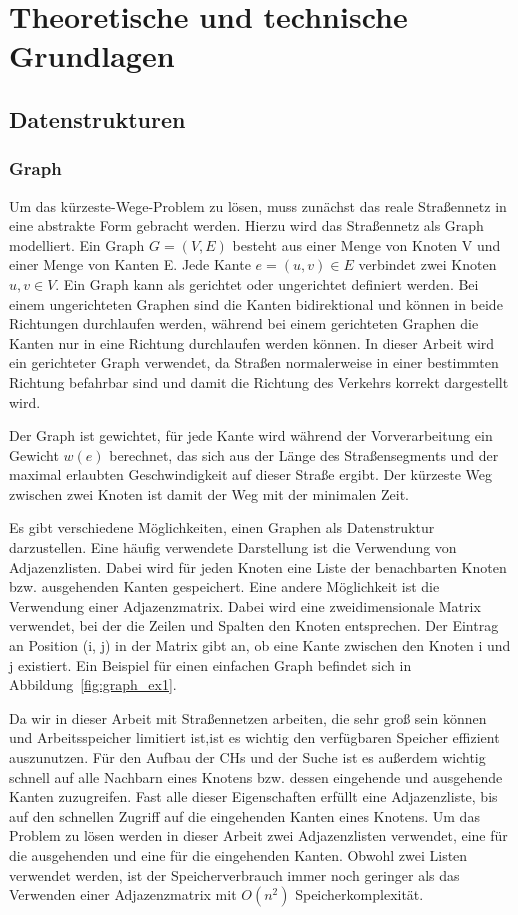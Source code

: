 \section{Theoretische und technische Grundlagen}

\subsection{Datenstrukturen}
\subsubsection{Graph}
Um das kürzeste-Wege-Problem zu lösen, muss zunächst das reale Straßennetz in eine abstrakte Form
gebracht werden. Hierzu wird das Straßennetz als Graph modelliert. Ein Graph $G = (V,E)$ besteht aus
einer Menge von Knoten V und einer Menge von Kanten E. Jede Kante $e = (u,v)\in E$ verbindet zwei
Knoten $u,v \in V$. Ein Graph kann als gerichtet oder ungerichtet definiert werden. Bei einem
ungerichteten  Graphen sind die Kanten bidirektional und können in beide Richtungen durchlaufen
werden, während bei einem gerichteten Graphen die Kanten nur in eine Richtung durchlaufen werden
können. In dieser Arbeit wird ein gerichteter Graph verwendet, da Straßen normalerweise in einer
bestimmten Richtung befahrbar sind und damit die Richtung des
Verkehrs korrekt dargestellt wird.

Der Graph ist gewichtet, \dH für jede Kante wird während der Vorverarbeitung ein Gewicht $w(e)$
berechnet, das sich aus der Länge des Straßensegments und der maximal erlaubten Geschwindigkeit auf
dieser Straße ergibt. Der kürzeste Weg zwischen zwei Knoten ist damit der Weg mit der minimalen Zeit.

Es gibt verschiedene Möglichkeiten, einen Graphen als Datenstruktur darzustellen. Eine häufig
verwendete Darstellung ist die Verwendung von Adjazenzlisten. Dabei wird für jeden Knoten eine Liste
der benachbarten Knoten bzw. ausgehenden Kanten gespeichert. Eine andere Möglichkeit ist die
Verwendung einer Adjazenzmatrix. Dabei wird eine zweidimensionale Matrix verwendet, bei der die
Zeilen und Spalten den Knoten entsprechen. Der Eintrag an Position (i, j) in der Matrix gibt an, ob
eine Kante zwischen den Knoten i und j existiert. Ein Beispiel für einen einfachen Graph befindet
sich in Abbildung~\ref{fig:graph_ex1}.

Da wir in dieser Arbeit mit Straßennetzen arbeiten, die sehr groß sein können und Arbeitsspeicher
limitiert ist,ist es wichtig den verfügbaren Speicher effizient auszunutzen. Für den Aufbau der
\ac{CHs} und der Suche ist es außerdem wichtig schnell auf alle Nachbarn eines Knotens bzw. dessen
eingehende und ausgehende Kanten zuzugreifen. Fast alle dieser Eigenschaften erfüllt eine
Adjazenzliste, bis auf den schnellen Zugriff auf die eingehenden Kanten eines Knotens. Um das
Problem zu lösen werden in dieser Arbeit zwei Adjazenzlisten verwendet, eine für die ausgehenden
und eine für die eingehenden Kanten. Obwohl zwei Listen verwendet werden, ist der Speicherverbrauch
immer noch geringer als das Verwenden einer Adjazenzmatrix mit $O(n^2)$ Speicherkomplexität.


